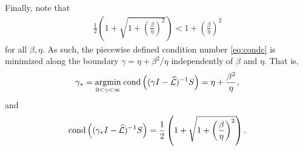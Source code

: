 \documentclass[a4paper,10pt]{article}
\begin{document}
%
Finally, note that
\begin{align*}
\frac{1}{2} \left( 1 + \sqrt{1 + \left( \frac{\beta}{\eta} \right)^2} \right) < 1 + \left( \frac{\beta}{\eta} \right)^2
\end{align*}
for all $\beta, \eta$.  As such, the piecewise defined condition number \eqref{eq:condc} is minimized along the boundary $\gamma = \eta + \beta^2 / \eta$ independently of $\beta$ and $\eta$. That is,
\begin{align}
\gamma_* 
= 
\underset{0 < \gamma < \infty}{\textnormal{argmin}} \; \textnormal{cond} \left((\gamma I- \widehat{\mathcal{L}})^{-1}S\right) 
= 
\eta + \frac{\beta^2}{\eta},
\end{align}
and
\begin{align} \label{eq:cond_min}
\textnormal{cond}\left((\gamma_* I- \widehat{\mathcal{L}})^{-1}S\right)
=
\frac{1}{2} \left( 1 + \sqrt{1 + \left( \frac{\beta}{\eta} \right)^2} \right).
\end{align}
\end{document}
